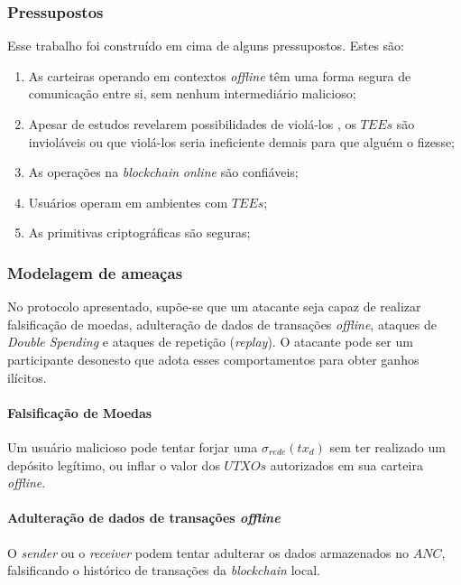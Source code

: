 \documentclass[
  12pt,
  a4paper,
  oneside,
  article,
]{abntex2}
\begin{document}
\subsubsection{Pressupostos}

Esse trabalho foi construído em cima de alguns pressupostos. Estes são:

\begin{enumerate}
	\item As carteiras operando em contextos \textit{offline} têm uma forma segura de comunicação entre si, sem nenhum intermediário malicioso;
	\item Apesar de estudos revelarem possibilidades de violá-los \cite{skorobogatov2012}, os $TEEs$ são invioláveis ou que violá-los seria ineficiente demais para que alguém o fizesse;
	\item As operações na \textit{blockchain} \textit{online} são confiáveis;
	\item Usuários operam em ambientes com $TEEs$;
	\item As primitivas criptográficas são seguras;
\end{enumerate}

\subsubsection{Modelagem de ameaças}

No protocolo apresentado, supõe-se que um atacante seja capaz de realizar falsificação de moedas, adulteração de dados de transações \textit{offline}, ataques de \textit{Double Spending} e ataques de repetição (\textit{replay}). O atacante pode ser um participante desonesto que adota esses comportamentos para obter ganhos ilícitos.

\paragraph{Falsificação de Moedas}
Um usuário malicioso pode tentar forjar uma $\sigma_{rede}(tx_d)$ sem ter realizado um depósito legítimo, ou inflar o valor dos $UTXOs$ autorizados em sua carteira \textit{offline}.

\paragraph{Adulteração de dados de transações \textit{offline}}

O \textit{sender} ou o \textit{receiver} podem tentar adulterar os dados armazenados no $ANC$, falsificando o histórico de transações da \textit{blockchain} local.
\end{document}

